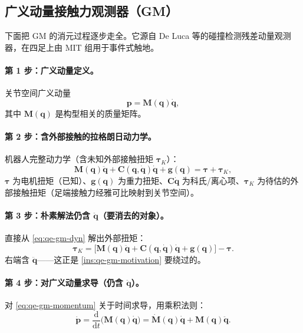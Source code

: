 \subsection{广义动量接触力观测器（GM）}
\label{subsec:qe-gm}

下面把 GM 的消元过程逐步走全。它源自 De Luca 等的碰撞检测残差动量观测器\cite{deluca2006collision}，在四足上由 MIT 组用于事件式触地\cite{bledt2018contact}。

\paragraph{第 1 步：广义动量定义。}
关节空间广义动量
\begin{equation}
  \boldsymbol p = \mathbf{M}(\boldsymbol q)\dot{\boldsymbol q},
  \label{eq:qe-gm-momentum}
\end{equation}
其中 $\mathbf{M}(\boldsymbol q)$ 是构型相关的质量矩阵。

\paragraph{第 2 步：含外部接触的拉格朗日动力学。}
机器人完整动力学（含未知外部接触扭矩 $\boldsymbol\tau_K$）：
\begin{equation}
  \mathbf{M}(\boldsymbol q)\ddot{\boldsymbol q} + \mathbf{C}(\boldsymbol q,\dot{\boldsymbol q})\dot{\boldsymbol q} + \boldsymbol g(\boldsymbol q) = \boldsymbol\tau + \boldsymbol\tau_K,
  \label{eq:qe-gm-dyn}
\end{equation}
$\boldsymbol\tau$ 为电机扭矩（已知）、$\boldsymbol g(\boldsymbol q)$ 为重力扭矩、$\mathbf{C}\dot{\boldsymbol q}$ 为科氏/离心项、$\boldsymbol\tau_K$ 为待估的外部接触扭矩（足端接触力经雅可比映射到关节空间）。

\paragraph{第 3 步：朴素解法仍含 $\ddot{\boldsymbol q}$（要消去的对象）。}
直接从 \cref{eq:qe-gm-dyn} 解出外部扭矩：
\begin{equation}
  \boldsymbol\tau_K = \big[\mathbf{M}(\boldsymbol q)\ddot{\boldsymbol q} + \mathbf{C}(\boldsymbol q,\dot{\boldsymbol q})\dot{\boldsymbol q} + \boldsymbol g(\boldsymbol q)\big] - \boldsymbol\tau.
  \label{eq:qe-gm-naive}
\end{equation}
右端含 $\ddot{\boldsymbol q}$——这正是 \cref{ins:qe-gm-motivation} 要绕过的。

\paragraph{第 4 步：对广义动量求导（仍含 $\ddot{\boldsymbol q}$）。}
对 \cref{eq:qe-gm-momentum} 关于时间求导，用乘积法则：
\begin{equation}
  \dot{\boldsymbol p} = \frac{\mathrm{d}}{\mathrm{d}t}\big(\mathbf{M}(\boldsymbol q)\dot{\boldsymbol q}\big)
  = \dot{\mathbf{M}}(\boldsymbol q)\dot{\boldsymbol q} + \mathbf{M}(\boldsymbol q)\ddot{\boldsymbol q}.
  \label{eq:qe-gm-pdot}
\end{equation}

